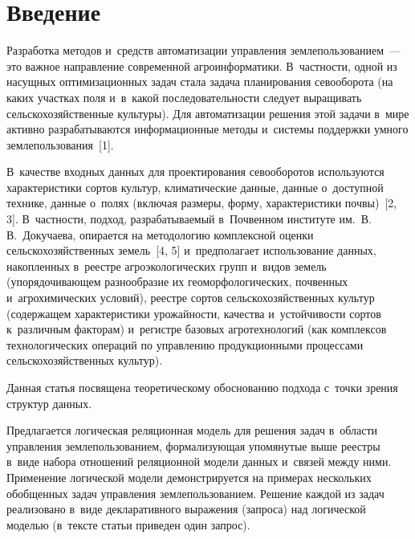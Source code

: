   



\thispagestyle{headings}

\begin{multicols}{2}

\label{st\stat}

\section{Введение}

    Разработка методов и~средств автоматизации управления 
землепользованием~--- это важное направление современной 
агроинформатики. В~частности, одной из насущных оптимизационных задач 
стала задача планирования севооборота (на каких участках поля и~в~какой 
последовательности следует выращивать сельскохозяйственные культуры). 
Для автоматизации решения этой задачи в~мире активно разрабатываются 
информационные методы и~системы поддержки умного 
землепользования~[1]. 

В~качестве входных данных для проектирования 
севооборотов используются характеристики сортов культур, климатические 
данные, данные о~доступной технике, данные о~полях (включая размеры, 
форму, характеристики почвы)~[2, 3]. В~част\-ности, подход, 
разрабатываемый в~Почвенном институте им.\ В.\,В.~Докучаева, опирается на 
методологию комплексной оценки сельскохозяйственных земель~[4, 5] 
и~предполагает использование данных, накопленных в~реестре 
агроэкологических групп и~видов земель (упорядочивающем разнообразие их 
геоморфологических, почвенных и~агрохимических условий), реестре сортов 
сельскохозяйственных культур (содержащем характеристики урожайности, 
качества и~устойчивости сортов к~различным факторам) и~регистре базовых 
агротехнологий (как комплексов технологических операций по управлению 
продукционными процессами сельскохозяйственных культур). 
    
    Данная статья посвящена теоретическому обосно\-ва\-нию подхода с~точки 
зрения структур данных. 

Предлагается логическая реляционная модель для 
решения задач в~об\-ласти управ\-ле\-ния землепользованием, 
формализующая упомянутые выше реестры в~виде набора отношений 
реляционной модели данных и~связей между ними. Применение логической 
модели демонстрируется на примерах нескольких обобщенных задач 
управления землепользованием. Решение каждой из задач реализовано в~виде 
декларативного выражения (запроса) над логической моделью (в~текс\-те 
статьи приведен один запрос).


\end{multicols}
